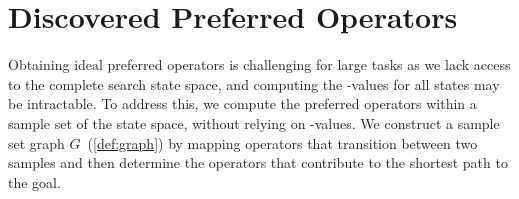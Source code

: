 \documentclass[ppgc,diss,english]{iiufrgs}
\begin{document}
%
%



\section{Discovered Preferred Operators}
\label{sec:sample-discovered-po}
Obtaining ideal preferred operators is challenging for large tasks as we lack access to the complete search state space, and computing the \hstar-values for all states may be intractable. To address this, we compute the preferred operators within a sample set of the state space, without relying on \hstar-values. We construct a sample set graph $G$~(\vref{def:graph}) by mapping operators that transition between two samples and then determine the operators that contribute to the shortest path to the goal.
\end{document}
